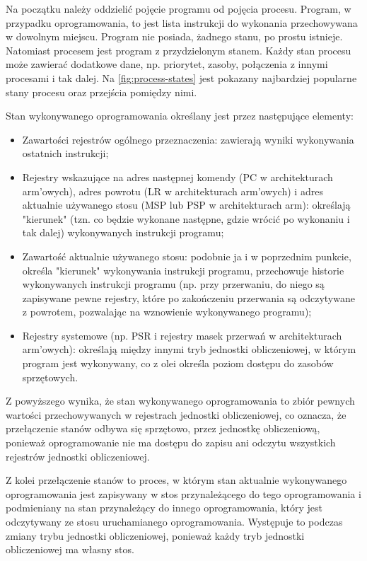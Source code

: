 \documentclass[../main]{subfiles}
\begin{document}
Na początku należy oddzielić pojęcie programu od pojęcia procesu. Program, w przypadku oprogramowania, to jest lista instrukcji do wykonania przechowywana w dowolnym miejscu. Program nie posiada, żadnego stanu, po prostu istnieje. Natomiast procesem jest program z przydzielonym stanem. Każdy stan procesu może zawierać dodatkowe dane, np. priorytet, zasoby, połączenia z innymi procesami i tak dalej. Na \cref{fig:process-states} jest pokazany najbardziej popularne stany procesu oraz przejścia pomiędzy nimi.

Stan wykonywanego oprogramowania określany jest przez następujące elementy:

\begin{itemize}
    \item Zawartości rejestrów ogólnego przeznaczenia: zawierają wyniki wykonywania ostatnich instrukcji;
    \item Rejestry wskazujące na adres następnej komendy (PC w architekturach \acrshort{arm}'owych), adres powrotu (LR w architekturach \acrshort{arm}'owych) i adres aktualnie używanego stosu (MSP lub PSP w architekturach \acrshort{arm}): określają "kierunek" (tzn. co będzie wykonane następne, gdzie wrócić po wykonaniu i tak dalej) wykonywanych instrukcji programu;
    \item Zawartość aktualnie używanego stosu: podobnie ja i w poprzednim punkcie, określa "kierunek" wykonywania instrukcji programu, przechowuje historie wykonywanych instrukcji programu (np. przy przerwaniu, do niego są zapisywane pewne rejestry, które po zakończeniu przerwania są odczytywane z powrotem, pozwalając na wznowienie wykonywanego programu);
    \item Rejestry systemowe (np. PSR i rejestry masek przerwań w architekturach \acrshort{arm}'owych): określają między innymi tryb jednostki obliczeniowej, w którym program jest wykonywany, co z olei określa poziom dostępu do zasobów sprzętowych. 
\end{itemize}

Z powyższego wynika, że stan wykonywanego oprogramowania to zbiór pewnych wartości przechowywanych w rejestrach jednostki obliczeniowej, co oznacza, że przełączenie stanów odbywa się sprzętowo, przez jednostkę obliczeniową, ponieważ oprogramowanie nie ma dostępu do zapisu ani odczytu wszystkich rejestrów jednostki obliczeniowej.

Z kolei przełączenie stanów to proces, w którym stan aktualnie wykonywanego oprogramowania jest zapisywany w stos przynależącego do tego oprogramowania i podmieniany na stan przynależący do innego oprogramowania, który jest odczytywany ze stosu uruchamianego oprogramowania. Występuje to podczas zmiany trybu jednostki obliczeniowej, ponieważ każdy tryb jednostki obliczeniowej ma własny stos.
\end{document}
